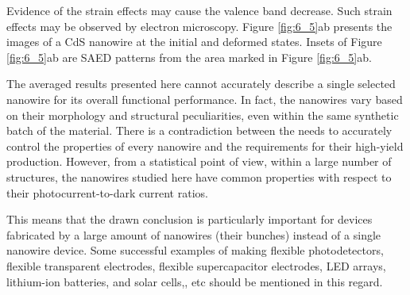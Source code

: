 Evidence of the strain effects may cause the valence band decrease. Such strain effects may be observed by electron microscopy. 
Figure \ref{fig:6_5}ab presents the images of a CdS nanowire at the initial and deformed states. 
Insets of Figure \ref{fig:6_5}ab are SAED patterns from the area marked in Figure \ref{fig:6_5}ab. 

The averaged results presented here cannot accurately describe a single selected nanowire for its overall functional performance. 
In fact, the nanowires vary based on their morphology and structural peculiarities, even within the same synthetic batch of the material. 
There is a contradiction between the needs to accurately control the properties of every nanowire and the requirements for their high-yield production. However, from a statistical point of view, within a large number of structures, the nanowires studied here have common properties with respect to their photocurrent-to-dark current ratios. 


This means that the drawn conclusion is particularly important for devices fabricated by a large amount of nanowires (their bunches) instead of a single nanowire device. 
Some successful examples of making flexible photodetectors,\cite{Xu2015b} flexible transparent electrodes,\cite{Liu2014a} flexible supercapacitor electrodes,\cite{Liu2014a} LED arrays,\cite{Wang2015a} lithium-ion batteries,\cite{Wang2015} and solar cells,\cite{Zhang2012}, etc should be mentioned in this regard. \\

